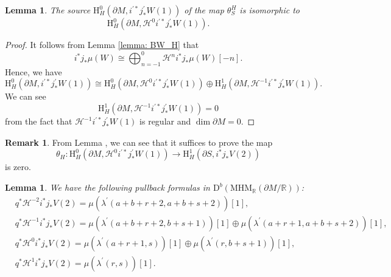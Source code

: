 \documentclass[11pt, a4paper]{amsart}
\theoremstyle{plain}
\newtheorem{lemma}[theorem]{Lemma}
\theoremstyle{definition}
\newtheorem{remark}[theorem]{Remark}
\numberwithin{equation}{section}
\def\RR{\mathbb{R}}
\begin{document}
\begin{lemma}
    The source $\mathrm{H}^{0}_{H}(\partial{M}, i^{\prime*}j^{\prime}_{*}W(1))$ of the map $\theta^{H}_{S}$ is isomorphic to 
    \begin{equation*}
        \mathrm{H}^{0}_{H}(\partial{M}, \mathcal{H}^{0}i^{\prime*}j^{\prime}_{*}W(1)).
    \end{equation*}
\end{lemma}

\begin{proof}
    It follows from Lemma \ref{lemma: BW_H} that 
    \begin{equation*}
        i^{*}j_{*} \mu(W) \cong \bigoplus_{n = -1}^{0} \mathcal{H}^{n}i^{*}j_{*} \mu(W)[-n]. 
    \end{equation*}
    Hence, we have 
    \begin{equation*}
        \mathrm{H}^{0}_{H}(\partial{M}, i^{\prime*}j^{\prime}_{*}W(1)) \cong \mathrm{H}^{0}_{H}(\partial{M}, \mathcal{H}^{0}i^{\prime*}j^{\prime}_{*}W(1)) \oplus \mathrm{H}^{1}_{H}(\partial{M}, \mathcal{H}^{-1}i^{\prime*}j^{\prime}_{*}W(1)). 
    \end{equation*}
    We can see 
    \begin{equation*}
        \mathrm{H}^{1}_{H}(\partial{M}, \mathcal{H}^{-1}i^{\prime*}j^{\prime}_{*}W(1)) = 0 
    \end{equation*}
    from the fact that $\mathcal{H}^{-1}i^{\prime*}j^{\prime}_{*}W(1)$ is regular and $\dim \partial M = 0$. 
\end{proof}
\begin{remark}
    From Lemma \label{lemma: Hodge: source of theta}, we can see that it suffices to prove the map
    \begin{equation*}
        \theta_{H} \colon \mathrm{H}^{0}_{H}(\partial{M}, \mathcal{H}^{0}i^{\prime*}j^{\prime}_{*}W(1)) \rightarrow  \mathrm{H}^{1}_{H}(\partial{S}, i^{*}j_{*}V(2))
    \end{equation*}
    is zero. 
\end{remark}

\begin{lemma}
\label{lemma: pullback of deg of MHS}
    We have the following pullback formulas in $\mathrm{D}^{b}(\mathrm{MHM}_{\RR}(\partial M/\RR))$: 
    \begin{align*}
         & q^{*} \mathcal{H}^{-2}i^{*}j_{*}V(2) = \mu(\lambda^{\prime}(a + b + r + 2, a + b + s + 2))[1],  \\
         & q^{*} \mathcal{H}^{-1}i^{*}j_{*}V(2) = \mu(\lambda^{\prime}(a + b + r + 2, b + s + 1))[1] \oplus \mu(\lambda^{\prime}(a + r + 1, a + b + s + 2))[1], \\
         & q^{*} \mathcal{H}^{0}i^{*}j_{*}V(2) = \mu(\lambda^{\prime}(a + r + 1 , s))[1] \oplus \mu(\lambda^{\prime}(r, b + s + 1))[1], \\
         & q^{*} \mathcal{H}^{1}i^{*}j_{*}V(2) = \mu(\lambda^{\prime}(r, s))[1]. 
    \end{align*}
\end{lemma}
\end{document}
